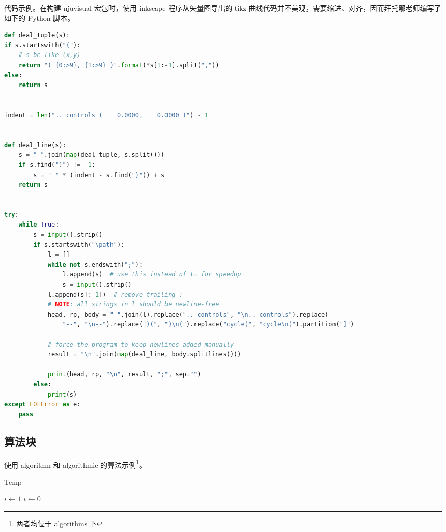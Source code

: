 代码示例。在构建 \textsf{njuvisual} 宏包时，使用 inkscape 程序从矢量图导出的 \textsf{tikz} 曲线代码并不美观，需要缩进、对齐，因而拜托鄢老师编写了如下的 Python 脚本。
\begin{lstlisting}[language=Python,morekeywords={startswith,endswith,split,strip,join,find,append,replace}]
def deal_tuple(s):
if s.startswith("("):
    # s be like (x,y)
    return "( {0:>9}, {1:>9} )".format(*s[1:-1].split(","))
else:
    return s


indent = len(".. controls (    0.0000,    0.0000 )") - 1


def deal_line(s):
    s = " ".join(map(deal_tuple, s.split()))
    if s.find(")") != -1:
        s = " " * (indent - s.find(")")) + s
    return s


try:
    while True:
        s = input().strip()
        if s.startswith("\path"):
            l = []
            while not s.endswith(";"):
                l.append(s)  # use this instead of += for speedup
                s = input().strip()
            l.append(s[:-1])  # remove trailing ;
            # NOTE: all strings in l should be newline-free
            head, rp, body = " ".join(l).replace(".. controls", "\n.. controls").replace(
                "--", "\n--").replace(")(", ")\n(").replace("cycle(", "cycle\n(").partition("]")

            # force the program to keep newlines added manually
            result = "\n".join(map(deal_line, body.splitlines()))

            print(head, rp, "\n", result, ";", sep="")
        else:
            print(s)
except EOFError as e:
    pass
\end{lstlisting}

\subsection{算法块}

使用 {algorithm} 和 {algorithmic} 的算法示例\footnote{两者均位于 \textsf{algorithms} 下}。

\begin{algorithm}[htbp]
    \caption{Temp}
    \begin{algorithmic}
        \STATE $i\gets1$
        \ELSE{}
        \STATE $i\gets0$
        \ENDIF\ENDIF
    \end{algorithmic}
\end{algorithm}
